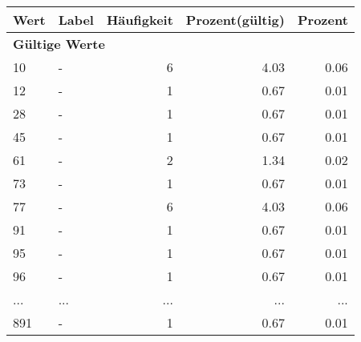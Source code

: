      \begin{longtable}{lXrrr}
     \toprule
     \textbf{Wert} & \textbf{Label} & \textbf{Häufigkeit} & \textbf{Prozent(gültig)} & \textbf{Prozent} \\
     \endhead
     \midrule
     \multicolumn{5}{l}{\textbf{Gültige Werte}}\\
        10 & \multicolumn{1}{X}{-} & %
          \num{6} &
          \num[round-mode=places,round-precision=2]{4.03} &
          \num[round-mode=places,round-precision=2]{0.06} \\
        12 & \multicolumn{1}{X}{-} & %
          \num{1} &
          \num[round-mode=places,round-precision=2]{0.67} &
          \num[round-mode=places,round-precision=2]{0.01} \\
        28 & \multicolumn{1}{X}{-} & %
          \num{1} &
          \num[round-mode=places,round-precision=2]{0.67} &
          \num[round-mode=places,round-precision=2]{0.01} \\
        45 & \multicolumn{1}{X}{-} & %
          \num{1} &
          \num[round-mode=places,round-precision=2]{0.67} &
          \num[round-mode=places,round-precision=2]{0.01} \\
        61 & \multicolumn{1}{X}{-} & %
          \num{2} &
          \num[round-mode=places,round-precision=2]{1.34} &
          \num[round-mode=places,round-precision=2]{0.02} \\
        73 & \multicolumn{1}{X}{-} & %
          \num{1} &
          \num[round-mode=places,round-precision=2]{0.67} &
          \num[round-mode=places,round-precision=2]{0.01} \\
        77 & \multicolumn{1}{X}{-} & %
          \num{6} &
          \num[round-mode=places,round-precision=2]{4.03} &
          \num[round-mode=places,round-precision=2]{0.06} \\
        91 & \multicolumn{1}{X}{-} & %
          \num{1} &
          \num[round-mode=places,round-precision=2]{0.67} &
          \num[round-mode=places,round-precision=2]{0.01} \\
        95 & \multicolumn{1}{X}{-} & %
          \num{1} &
          \num[round-mode=places,round-precision=2]{0.67} &
          \num[round-mode=places,round-precision=2]{0.01} \\
        96 & \multicolumn{1}{X}{-} & %
          \num{1} &
          \num[round-mode=places,round-precision=2]{0.67} &
          \num[round-mode=places,round-precision=2]{0.01} \\
       ... & ... & ... & ... & ... \\
        891 & \multicolumn{1}{X}{-} & %
          \num{1} &
          \num[round-mode=places,round-precision=2]{0.67} &
          \num[round-mode=places,round-precision=2]{0.01} \\


\end{longtable}
